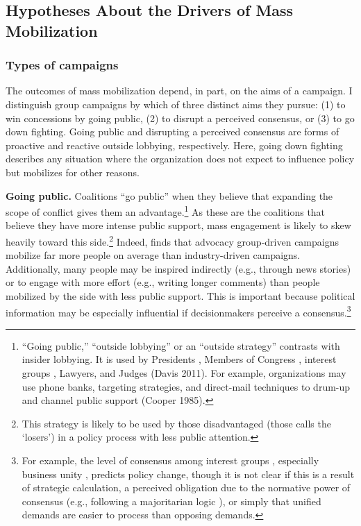 \documentclass[
      12pt,
        ]{article}
\begin{document}
\hypertarget{hypotheses-about-the-drivers-of-mass-mobilization}{%
\subsection{Hypotheses About the Drivers of Mass Mobilization}\label{hypotheses-about-the-drivers-of-mass-mobilization}}

\hypertarget{types-of-campaigns}{%
\subsubsection{Types of campaigns}\label{types-of-campaigns}}

The outcomes of mass mobilization depend, in part, on the aims of a
campaign. I distinguish group campaigns by which of three distinct aims
they pursue: (1) to win concessions by going public, (2) to disrupt a
perceived consensus, or (3) to go down fighting. Going public and
disrupting a perceived consensus are forms of proactive and reactive
outside lobbying, respectively. Here, going down fighting describes any
situation where the organization does not expect to influence policy but
mobilizes for other reasons.

\textbf{Going public.} Coalitions ``go public'' when they believe that
expanding the scope of conflict gives them an advantage.\footnote{``Going public,'' ``outside lobbying'' or an ``outside strategy''
  contrasts with insider lobbying. It is used by Presidents
  \citep{Kernell2007}, Members of Congress \citep{Malecha2012}, interest groups
  \citep{Walker1991, Dur2013}, Lawyers, and Judges (Davis 2011). For
  example, organizations may use phone banks, targeting strategies,
  and direct-mail techniques to drum-up and channel public support
  (Cooper 1985).} As these
are the coalitions that believe they have more intense public
support, mass engagement is likely to skew heavily toward this side.\footnote{This strategy is likely to be used by those disadvantaged (those
  \citet{Schattschneider1975} calls the `losers') in a policy process with
  less public attention.}
Indeed, \citet{Potter2017} finds that advocacy group-driven campaigns mobilize
far more people on average than industry-driven campaigns. Additionally,
many people may be inspired indirectly (e.g., through news stories) or
to engage with more effort (e.g., writing longer comments) than people
mobilized by the side with less public support. This is important
because political information may be especially influential if
decisionmakers perceive a consensus.\footnote{For example, the level of consensus among interest groups
  \citep{Golden1998, Yackee2006JPART}, especially business unity
  \citep{Yackee2006JOP, Haeder2015}, predicts policy change, though it is
  not clear if this is a result of strategic calculation, a perceived
  obligation due to the normative power of consensus (e.g., following
  a majoritarian logic \citep{Mendelson2011}), or simply that unified
  demands are easier to process than opposing demands.}
\end{document}
